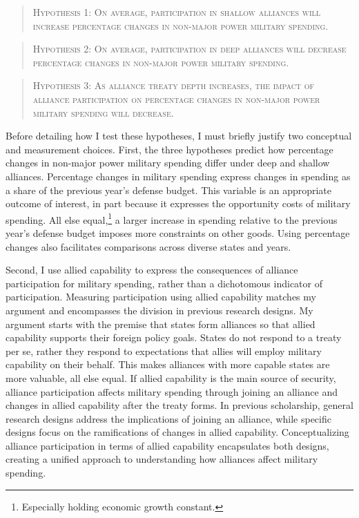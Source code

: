 \documentclass[12pt]{article}
\begin{document}
\begin{quote}
\textsc{Hypothesis 1: On average, participation in shallow alliances will increase percentage changes in non-major power military spending.}
\end{quote}

\begin{quote}
\textsc{Hypothesis 2: On average, participation in deep alliances will decrease percentage changes in non-major power military spending.}
\end{quote}

\begin{quote}
\textsc{Hypothesis 3: As alliance treaty depth increases, the impact of alliance participation on percentage changes in non-major power military spending will decrease.}
\end{quote}


Before detailing how I test these hypotheses, I must briefly justify two conceptual and measurement choices. 
First, the three hypotheses predict how percentage changes in non-major power military spending differ under deep and shallow alliances. 
Percentage changes in military spending express changes in spending as a share of the previous year's defense budget.
This variable is an appropriate outcome of interest, in part because it expresses the opportunity costs of military spending. 
All else equal,\footnote{Especially holding economic growth constant.} a larger increase in spending relative to the previous year's defense budget imposes more constraints on other goods. 
Using percentage changes also facilitates comparisons across diverse states and years. 


Second, I use allied capability to express the consequences of alliance participation for military spending, rather than a dichotomous indicator of participation.
Measuring participation using allied capability matches my argument and encompasses the division in  previous research designs. 
My argument starts with the premise that states form alliances so that allied capability supports their foreign policy goals. 
States do not respond to a treaty per se, rather they respond to expectations that allies will employ military capability on their behalf.
This makes alliances with more capable states are more valuable, all else equal.
If allied capability is the main source of security, alliance participation affects military spending through joining an alliance and changes in allied capability after the treaty forms. 
In previous scholarship, general research designs address the implications of joining an alliance, while specific designs focus on the ramifications of changes in allied capability. 
Conceptualizing alliance participation in terms of allied capability encapsulates both designs, creating a unified approach to understanding how alliances affect military spending. 
\end{document}
